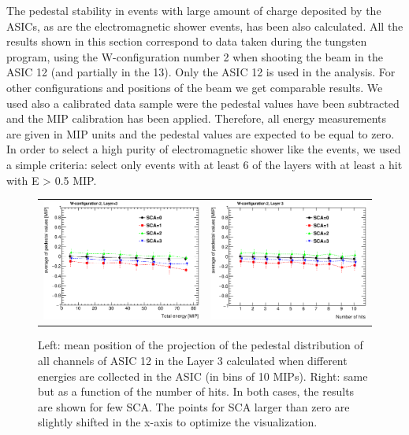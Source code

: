 \documentclass[a4paper,11pt]{article}
\begin{document}
The pedestal stability in events with large amount of charge deposited by the ASICs, as are the 
electromagnetic shower events, has been also calculated. All the results shown in this section correspond to data taken during the tungsten program, 
using the W-configuration number 2 when shooting the beam in the ASIC 12 (and partially in the 13). Only the ASIC 12 is used in the analysis. For other configurations and 
positions of the beam we get comparable results. We used also a calibrated data sample were the pedestal values have been 
subtracted and the MIP calibration has been applied. 
Therefore, all energy measurements are given in MIP units and the pedestal
values are expected to be equal to zero.
In order to select a high purity of
electromagnetic shower like the events, 
we used a simple criteria: select only events with at least 6 of the layers with at least a hit with E > 0.5 MIP.

\begin{figure}[!t]
  \centering 
    \begin{tabular}{ll}
      \includegraphics[width=2.8in]{figs/pedestal/pedestal_vs_energy_shower.eps} & \includegraphics[width=2.8in]{figs/pedestal/pedestal_vs_nhits_shower.eps} \\
    \end{tabular}
    \caption{Left: mean position of the projection of the pedestal distribution of all channels of ASIC 12 in the Layer 3 calculated when different energies are collected in the ASIC (in bins of 10 MIPs). Right: same but as a function of the number of hits. In both cases, the results are shown for few SCA. The points for SCA larger than zero are slightly shifted in the x-axis to optimize the visualization.}
\label{pedestal_shower_1}
\end{figure}
\end{document}
